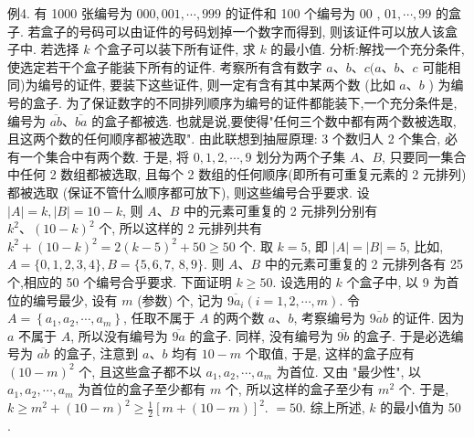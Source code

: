 例4. 有 1000 张编号为 $000,001, \cdots, 999$ 的证件和 100 个编号为 00 , $01, \cdots, 99$ 的盒子.
若盒子的号码可以由证件的号码划掉一个数字而得到, 则该证件可以放人该盒子中.
若选择 $k$ 个盒子可以装下所有证件, 求 $k$ 的最小值.
分析:解找一个充分条件,使选定若干个盒子能装下所有的证件.
考察所有含有数字 $a 、 b 、 c(a 、 b 、 c$ 可能相同)为编号的证件, 要装下这些证件, 则一定有含有其中某两个数 (比如 $a 、 b$ ) 为编号的盒子.
为了保证数字的不同排列顺序为编号的证件都能装下,一个充分条件是, 编号为 $\overline{a b} 、 \overline{b a}$ 的盒子都被选.
也就是说,要使得"任何三个数中都有两个数被选取, 且这两个数的任何顺序都被选取". 由此联想到抽屉原理: 3 个数归人 2 个集合, 必有一个集合中有两个数.
于是, 将 $0,1,2, \cdots, 9$ 划分为两个子集 $A 、 B$, 只要同一集合中任何 2 数组都被选取, 且每个 2 数组的任何顺序(即所有可重复元素的 2 元排列)都被选取 (保证不管什么顺序都可放下), 则这些编号合乎要求.
设 $|A|=k,|B|=10-k$, 则 $A 、 B$ 中的元素可重复的 2 元排列分别有 $k^2 、(10-k)^2$ 个, 所以这样的 2 元排列共有 $k^2+(10-k)^2=2(k-5)^2+ 50 \geqslant 50$ 个.
取 $k=5$, 即 $|A|=|B|=5$, 比如, $A=\{0,1,2,3,4\}, B=\{5,6,7$, $8,9\}$. 则 $A 、 B$ 中的元素可重复的 2 元排列各有 25 个,相应的 50 个编号合乎要求.
下面证明 $k \geqslant 50$.
设选用的 $k$ 个盒子中, 以 9 为首位的编号最少, 设有 $m$ (参数) 个, 记为 $\overline{9 a_i} (i=1,2, \cdots, m)$. 令 $A=\left\{a_1, a_2, \cdots, a_m\right\}$, 任取不属于 $A$ 的两个数 $a 、 b$, 考察编号为 $\overline{9 a b}$ 的证件.
因为 $a$ 不属于 $A$, 所以没有编号为 $\overline{9 a}$ 的盒子.
同样, 没有编号为 $\overline{9 b}$ 的盒子.
于是必选编号为 $\overline{a b}$ 的盒子, 注意到 $a 、 b$ 均有 $10-m$ 个取值, 于是, 这样的盒子应有 $(10-m)^2$ 个, 且这些盒子都不以 $a_1, a_2, \cdots, a_m$ 为首位.
又由 "最少性", 以 $a_1, a_2, \cdots, a_m$ 为首位的盒子至少都有 $m$ 个, 所以这样的盒子至少有 $m^2$ 个.
于是, $k \geqslant m^2+(10-m)^2 \geqslant \frac{1}{2}[m+(10-m)]^2$. $=50$.
综上所述, $k$ 的最小值为 50 .



